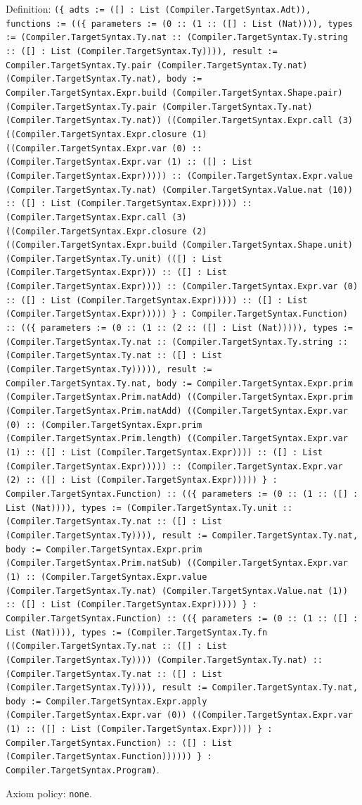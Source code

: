 \documentclass[11pt]{article}
\begin{document}
\noindent Definition: \texttt{(\{ adts := ([] : List (Compiler.TargetSyntax.Adt)), functions := ((\{ parameters := (0 :: (1 :: ([] : List (Nat)))), types := (Compiler.TargetSyntax.Ty.nat :: (Compiler.TargetSyntax.Ty.string :: ([] : List (Compiler.TargetSyntax.Ty)))), result := Compiler.TargetSyntax.Ty.pair (Compiler.TargetSyntax.Ty.nat) (Compiler.TargetSyntax.Ty.nat), body := Compiler.TargetSyntax.Expr.build (Compiler.TargetSyntax.Shape.pair) (Compiler.TargetSyntax.Ty.pair (Compiler.TargetSyntax.Ty.nat) (Compiler.TargetSyntax.Ty.nat)) ((Compiler.TargetSyntax.Expr.call (3) ((Compiler.TargetSyntax.Expr.closure (1) ((Compiler.TargetSyntax.Expr.var (0) :: (Compiler.TargetSyntax.Expr.var (1) :: ([] : List (Compiler.TargetSyntax.Expr))))) :: (Compiler.TargetSyntax.Expr.value (Compiler.TargetSyntax.Ty.nat) (Compiler.TargetSyntax.Value.nat (10)) :: ([] : List (Compiler.TargetSyntax.Expr))))) :: (Compiler.TargetSyntax.Expr.call (3) ((Compiler.TargetSyntax.Expr.closure (2) ((Compiler.TargetSyntax.Expr.build (Compiler.TargetSyntax.Shape.unit) (Compiler.TargetSyntax.Ty.unit) (([] : List (Compiler.TargetSyntax.Expr))) :: ([] : List (Compiler.TargetSyntax.Expr)))) :: (Compiler.TargetSyntax.Expr.var (0) :: ([] : List (Compiler.TargetSyntax.Expr))))) :: ([] : List (Compiler.TargetSyntax.Expr))))) \} : Compiler.TargetSyntax.Function) :: ((\{ parameters := (0 :: (1 :: (2 :: ([] : List (Nat))))), types := (Compiler.TargetSyntax.Ty.nat :: (Compiler.TargetSyntax.Ty.string :: (Compiler.TargetSyntax.Ty.nat :: ([] : List (Compiler.TargetSyntax.Ty))))), result := Compiler.TargetSyntax.Ty.nat, body := Compiler.TargetSyntax.Expr.prim (Compiler.TargetSyntax.Prim.natAdd) ((Compiler.TargetSyntax.Expr.prim (Compiler.TargetSyntax.Prim.natAdd) ((Compiler.TargetSyntax.Expr.var (0) :: (Compiler.TargetSyntax.Expr.prim (Compiler.TargetSyntax.Prim.length) ((Compiler.TargetSyntax.Expr.var (1) :: ([] : List (Compiler.TargetSyntax.Expr)))) :: ([] : List (Compiler.TargetSyntax.Expr))))) :: (Compiler.TargetSyntax.Expr.var (2) :: ([] : List (Compiler.TargetSyntax.Expr))))) \} : Compiler.TargetSyntax.Function) :: ((\{ parameters := (0 :: (1 :: ([] : List (Nat)))), types := (Compiler.TargetSyntax.Ty.unit :: (Compiler.TargetSyntax.Ty.nat :: ([] : List (Compiler.TargetSyntax.Ty)))), result := Compiler.TargetSyntax.Ty.nat, body := Compiler.TargetSyntax.Expr.prim (Compiler.TargetSyntax.Prim.natSub) ((Compiler.TargetSyntax.Expr.var (1) :: (Compiler.TargetSyntax.Expr.value (Compiler.TargetSyntax.Ty.nat) (Compiler.TargetSyntax.Value.nat (1)) :: ([] : List (Compiler.TargetSyntax.Expr))))) \} : Compiler.TargetSyntax.Function) :: ((\{ parameters := (0 :: (1 :: ([] : List (Nat)))), types := (Compiler.TargetSyntax.Ty.fn ((Compiler.TargetSyntax.Ty.nat :: ([] : List (Compiler.TargetSyntax.Ty)))) (Compiler.TargetSyntax.Ty.nat) :: (Compiler.TargetSyntax.Ty.nat :: ([] : List (Compiler.TargetSyntax.Ty)))), result := Compiler.TargetSyntax.Ty.nat, body := Compiler.TargetSyntax.Expr.apply (Compiler.TargetSyntax.Expr.var (0)) ((Compiler.TargetSyntax.Expr.var (1) :: ([] : List (Compiler.TargetSyntax.Expr)))) \} : Compiler.TargetSyntax.Function) :: ([] : List (Compiler.TargetSyntax.Function)))))) \} : Compiler.TargetSyntax.Program)}.\par
\noindent Axiom policy: \texttt{none}.\par
\end{document}
